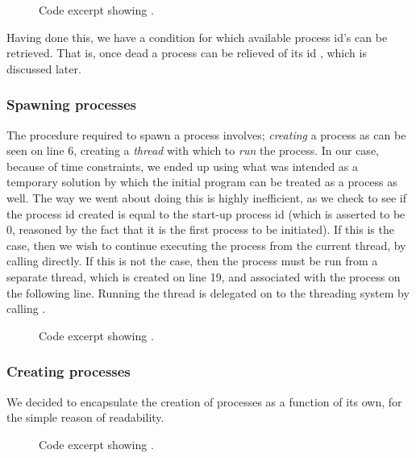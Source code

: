 {\begin{figure}[H]
    
    \label{code:process_init}
    \caption{Code excerpt showing .}
\end{figure}

Having done this, we have a condition for which available process id's can be
retrieved. That is, once dead a process can be relieved of its id
, which is discussed later.

\subsubsection{Spawning processes}
The procedure required to spawn a process involves; {\it creating} a process
 as can be seen on line 6, creating a
{\it thread} with which to {\it run} the process. In our case, because of time
constraints, we ended up using what was intended as a temporary solution by
which the initial program can be treated as a process as well. The way we went
about doing this is highly inefficient, as we check to see if the process id
created is equal to the start-up process id (which is asserted to be 0,
reasoned by the fact that it is the first process to be initiated). If this is
the case, then we wish to continue executing the process from the current
thread, by calling  directly. If this is not the case,
then the process must be run from a separate thread, which is created on line
19, and associated with the process on the following line. Running the thread
is delegated on to the threading system by calling .
\begin{figure}[H]
    
    \caption{Code excerpt showing .}
    \label{code:process_spawn}
\end{figure}

\subsubsection{Creating processes}
We decided to encapsulate the creation of processes as a function of its own,
for the simple reason of readability.
\begin{figure}[H]
    
    \caption{Code excerpt showing .}
    \label{code:process_create_process}
\end{figure}

}
